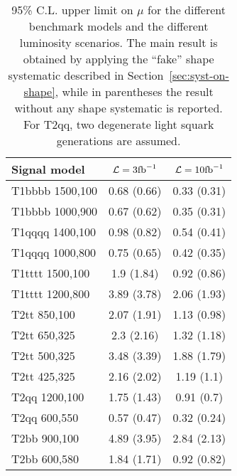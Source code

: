 \begin{table}
  \centering
  \caption{95\% C.L. upper limit on $\mu$ for the different benchmark models and the different luminosity scenarios. 
  The main result is obtained by applying 
  the ``fake'' shape systematic described in Section~\ref{sec:syst-on-shape}, 
while in parentheses the result without any shape systematic is reported. 
For T2qq, two degenerate light squark generations are assumed.}
  \label{tab:results_ul}
  \footnotesize
  \begin{tabular}{lcc}
    \hline
    \hline
    Signal model & $\mathcal{L} = 3 \text{fb}^{-1}$ & $\mathcal{L} = 10 \text{fb}^{-1}$ \\
    \hline
    \hline
    T1bbbb 1500,100  & 0.68 (0.66) & 0.33 (0.31) \\ 
    T1bbbb 1000,900  & 0.67 (0.62) & 0.35 (0.31) \\ 
    T1qqqq 1400,100  & 0.98 (0.82) & 0.54 (0.41) \\ 
    T1qqqq 1000,800  & 0.75 (0.65) & 0.42 (0.35) \\ 
    T1tttt 1500,100  & 1.9 (1.84) & 0.92 (0.86) \\  
    T1tttt 1200,800  & 3.89 (3.78) & 2.06 (1.93) \\ \hline
    T2tt 850,100     & 2.07 (1.91) & 1.13 (0.98) \\ 
    T2tt 650,325     & 2.3 (2.16) & 1.32 (1.18) \\  
    T2tt 500,325     & 3.48 (3.39) & 1.88 (1.79) \\ 
    T2tt 425,325     & 2.16 (2.02) & 1.19 (1.1) \\  
    T2qq 1200,100    & 1.75 (1.43) & 0.91 (0.7) \\  
    T2qq 600,550     & 0.57 (0.47) & 0.32 (0.24) \\ 
    T2bb 900,100     & 4.89 (3.95) & 2.84 (2.13) \\ 
    T2bb 600,580     & 1.84 (1.71) & 0.92 (0.82) \\ 
    \hline
    \hline
  \end{tabular} 
\end{table}


